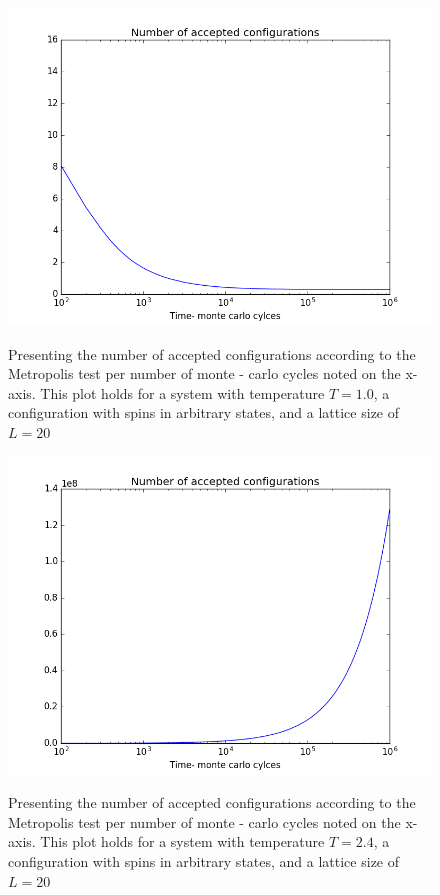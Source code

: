 \documentclass[12pt]{article}
\begin{document}
\begin{figure}[H]
\includegraphics[scale=0.6]{accept_config_1.png}\label{fig:accept_config_1}
\caption{Presenting the number of accepted configurations according to the Metropolis test per number of monte - carlo cycles noted on the x-axis. This plot holds for a system with temperature $T = 1.0$, a configuration with spins in arbitrary states, and a lattice size of $L = 20 $}
\end{figure}

\begin{figure}[H]
\includegraphics[scale=0.6]{accept_config.png}\label{fig:accept_config}
\caption{Presenting the number of accepted configurations according to the Metropolis test per number of monte - carlo cycles noted on the x-axis. This plot holds for a system with temperature $T = 2.4$, a configuration with spins in arbitrary states, and a lattice size of $L = 20 $}
\end{figure}
\fi
\end{document}
